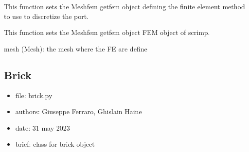\documentclass[letterpaper,10pt,english]{sphinxmanual}
\begin{document}
\begin{fulllineitems}

\begin{fulllineitems}
\label{\detokenize{scrimp:scrimp.fem.FEM.set_fem}}
\pysigstartsignatures
\pysiglinewithargsret
{}
{}
{}
\pysigstopsignatures
\sphinxAtStartPar
This function sets the Meshfem getfem object defining the finite element method to use to discretize the port.

\end{fulllineitems}


\begin{fulllineitems}
\label{\detokenize{scrimp:scrimp.fem.FEM.set_mesh}}
\pysigstartsignatures
\pysiglinewithargsret
{}
{}
{}
\pysigstopsignatures
\sphinxAtStartPar
This function sets the Meshfem getfem object FEM object of scrimp.
\begin{description}
\sphinxAtStartPar
mesh (Mesh): the mesh where the FE are define

\end{description}

\end{fulllineitems}


\end{fulllineitems}



\subsection{Brick}
\label{\detokenize{scrimp:module-scrimp.brick}}\label{\detokenize{scrimp:brick}}\begin{itemize}
\item {} 
\sphinxAtStartPar
file:             brick.py

\item {} 
\sphinxAtStartPar
authors:          Giuseppe Ferraro, Ghislain Haine

\item {} 
\sphinxAtStartPar
date:             31 may 2023

\item {} 
\sphinxAtStartPar
brief:            class for brick object

\end{itemize}
\end{document}
